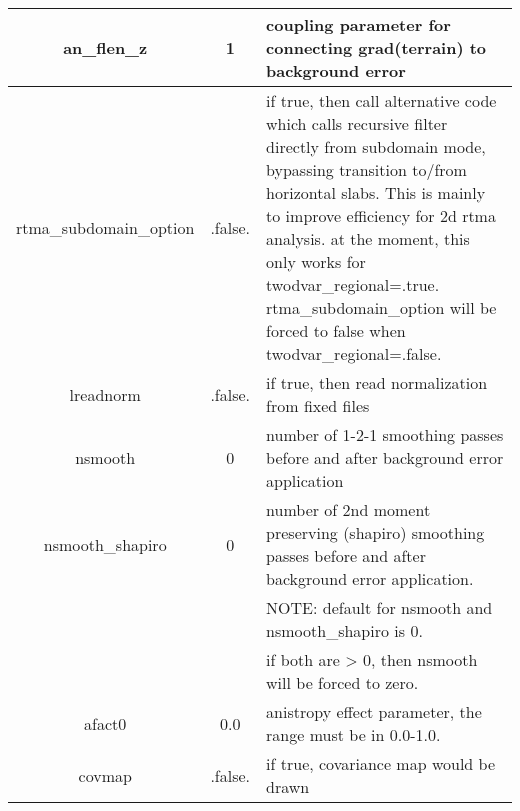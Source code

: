 \begin{table}[h]
\begin{tabular}{| c | c | p{9cm} |}
 \hline
 an\_flen\_z & 1 & coupling parameter for connecting grad(terrain) to background error \\
 \hline
 rtma\_subdomain\_option & .false. & if true, then call alternative code which calls recursive filter directly from subdomain mode, bypassing transition to/from horizontal slabs.  This is mainly to improve efficiency for 2d rtma analysis.  at the moment, this only works for twodvar\_regional=.true.  rtma\_subdomain\_option will be forced to false when twodvar\_regional=.false. \\
 \hline
 lreadnorm & .false. & if true, then read normalization from fixed files \\
 \hline
 nsmooth & 0 & number of 1-2-1 smoothing passes before and after background error application \\
 \hline
 nsmooth\_shapiro & 0 & number of 2nd moment preserving (shapiro) smoothing passes before and after background error application. \\
 &&NOTE:  default for nsmooth and nsmooth\_shapiro is 0.\\
 &&if both are > 0, then nsmooth will be forced to zero. \\
 \hline
 afact0	& 0.0 & anistropy effect parameter, the range must be in 0.0-1.0. \\
 \hline
 covmap & .false. & if true, covariance map would be drawn \\
 \hline
 \end{tabular}
\end{table}

